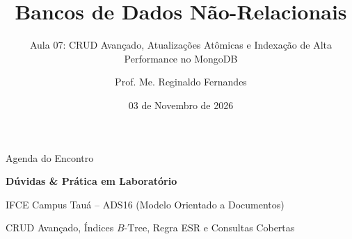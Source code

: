 \documentclass[aspectratio=169,t]{beamer}
\author{Prof. Me. Reginaldo Fernandes}
\institute{Instituto Federal do Ceará -- Campus Tauá \\ Tecnologia em Análise e Desenvolvimento de Sistemas}
\title{Bancos de Dados Não-Relacionais}
\subtitle{Aula 07: CRUD Avançado, Atualizações Atômicas e Indexação de Alta Performance no MongoDB}
\date{03 de Novembro de 2026}
\begin{document}
\frame[plain]{\titlepage}

\begin{frame}{Agenda do Encontro}
  \vspace{0.3cm}
  \tableofcontents
\end{frame}







\begin{frame}[plain]
  \vspace{2cm}
  \centering
  {\Huge \textbf{Dúvidas \& Prática em Laboratório}}\par
  \vspace{0.8cm}
  {\large IFCE Campus Tauá -- ADS16 (Modelo Orientado a Documentos)}\par
  \vspace{0.3cm}
  {\normalsize CRUD Avançado, Índices $B\text{-Tree}$, Regra ESR e Consultas Cobertas}
\end{frame}
\end{document}
